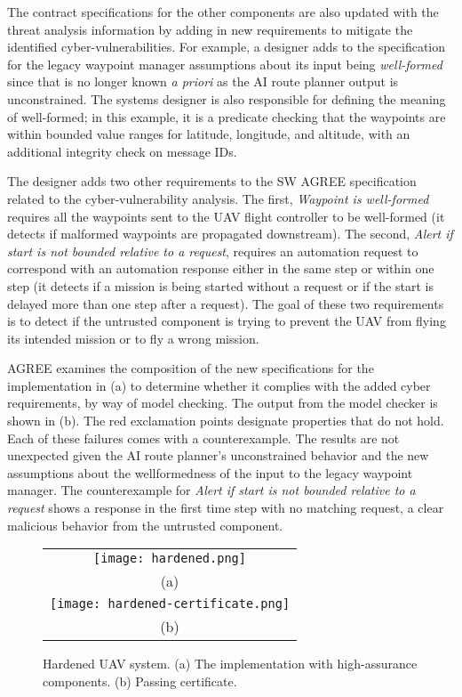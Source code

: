 The contract specifications for the other components are also updated with the threat analysis information by adding in new requirements to mitigate the identified cyber-vulnerabilities. For example, a designer adds to the specification for the legacy waypoint manager assumptions about its input being \emph{well-formed} since that is no longer known \emph{a priori} as the AI route planner output is unconstrained. The systems designer is also responsible for defining the meaning of well-formed; in this example, it is a predicate checking that the waypoints are within bounded value ranges for latitude, longitude, and altitude, with an additional integrity check on message IDs.

The designer adds two other requirements to the SW AGREE specification related to the cyber-vulnerability analysis.  The first, \emph{Waypoint is well-formed} requires all the waypoints sent to the UAV flight controller to be well-formed (it detects if malformed waypoints are propagated downstream).  The second, \emph{Alert if start is not bounded relative to a request}, requires an automation request to correspond with an automation response either in the same step or within one step (it detects if a mission is being started without a request or if the start is delayed more than one step after a request). The goal of these two requirements is to detect if the untrusted component is trying to prevent the UAV from flying its intended mission or to fly a wrong mission. 

AGREE examines the composition of the new specifications for the implementation in (a) to determine whether it complies with the added cyber requirements, by way of model checking. The output from the model checker is shown in (b). The red exclamation points designate properties that do not hold. Each of these failures comes with a counterexample. The results are not unexpected given the AI route planner's unconstrained behavior and the new assumptions about the wellformedness of the input to the legacy waypoint manager. The counterexample for \emph{Alert if start is not bounded relative to a request} shows a response in the first time step with no matching request, a clear malicious behavior from the untrusted component.

\begin{figure*}
  \begin{center}
    \begin{tabular}{c}
      \texttt{[image: hardened.png]} \\
      (a) \\
      \texttt{[image: hardened-certificate.png]} \\
      (b)
    \end{tabular}
  \end{center}
  \caption{Hardened UAV system. (a) The implementation with high-assurance components. (b) Passing certificate.}
  \label{fig:hardened}
\end{figure*}

